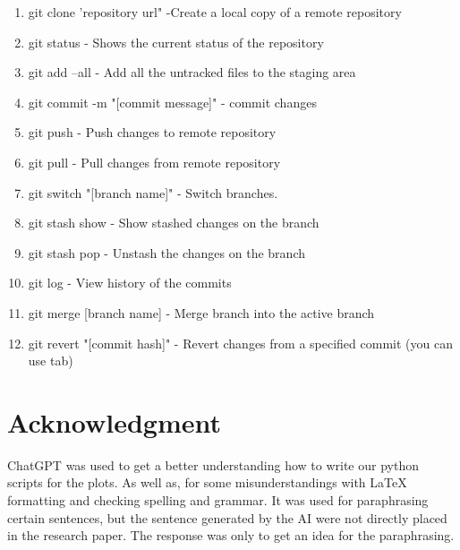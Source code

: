 \documentclass[]{report}
\begin{document}
	\begin{enumerate}[leftmargin=*]
		\item git clone 'repository url" -Create a local copy of a remote repository
		
		\item git status - Shows the current status of the repository
		
		\item git add --all - Add all the untracked files to the staging area
		
		\item git commit -m "[commit message]" - commit changes
		
		\item git push - Push changes to remote repository
		
		\item git pull - Pull changes from remote repository
		
		\item git switch "[branch name]" - Switch branches.
		
		\item git stash show - Show stashed changes on the branch
		
		\item git stash pop - Unstash the changes on the branch
		
		\item git log - View history of the commits
		
		\item git merge [branch name] - Merge branch into the active branch
		
		\item git revert "[commit hash]" - Revert changes from a specified commit (you can use tab)
	\end{enumerate}
	
	\section{Acknowledgment}
	
	ChatGPT was used to get a better understanding how to write our python scripts for the plots. As well as, for some misunderstandings with LaTeX formatting and checking spelling and grammar. It was used for paraphrasing certain sentences, but the sentence generated by the AI were not directly placed in the research paper. The response was only to get an idea for the paraphrasing.	
\end{document}
